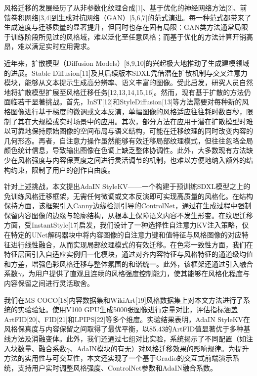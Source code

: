 \documentclass[twocolumn,a4paper,11pt]{ctexart}
\begin{document}
风格迁移的发展经历了从非参数化纹理合成[1]、基于优化的神经网络方法[2]、前馈卷积网络[3,4]到生成对抗网络（GAN）[5,6,7]的范式演进。每一种范式都带来了生成速度与迁移质量的显著提升，但同时也存在固有局限：GAN类方法通常局限于训练阶段所见过的风格域，难以泛化至任意风格；而基于优化的方法计算开销高昂，难以满足实时应用需求。

近年来，扩散模型（Diffusion Models）[8,9,10]的兴起极大地推动了生成建模领域的进展。Stable Diffusion[11]及其后续版本SDXL凭借潜在扩散机制与交叉注意力模块，能够从文本提示生成高分辨率、语义丰富的图像。受此启发，研究人员自然地将扩散模型扩展至风格迁移任务[12,13,14,15,16]。然而，现有基于扩散的方法仍面临若干显著挑战。首先，InST[12]和StyleDiffusion[13]等方法需要对每种新的风格图像进行基于梯度的微调或文本反演，单幅图像的风格适应往往耗时数百秒，限制了其在大规模或实时场景中的应用。其次，部分方法在应用于潜在扩散模型时难以可靠地保持原始图像的空间布局与语义结构，可能在迁移纹理的同时改变内容的几何形态。再者，自注意力操作虽然能够有效迁移局部纹理模式，但往往忽略全局颜色统计信息，导致输出图像在色调上缺乏整体协调性。此外，大多数现有方法缺少在风格强度与内容保真度之间进行灵活调节的机制，也难以方便地纳入额外的结构约束，限制了用户的创作自由度。

针对上述挑战，本文提出AdaIN StyleKV——一个构建于预训练SDXL模型之上的免训练风格迁移框架，无需任何微调或文本反演即可实现高质量的风格化。在结构保持方面，该框架引入Canny边缘检测引导的ControlNet，通过在生成过程中强制保留内容图像的边缘与轮廓结构，从根本上保障语义内容不发生形变。在纹理迁移方面，受InstantStyle[17]启发，我们设计了一种选择性自注意力KV注入策略，仅在特定的UNet解码器块中将内容图像的自注意力键和值特征与风格图像的对应特征进行线性融合，从而实现局部纹理模式的有效迁移。在色彩一致性方面，我们在特征层面引入自适应实例归一化模块，通过对齐内容特征与风格特征的通道级均值和方差，增强色彩风格迁移与整体氛围的和谐统一。此外，该框架还通过引入融合系数$\gamma$，为用户提供了直观且连续的风格强度控制能力，使其能够在风格化程度与内容保留之间进行灵活取舍。

我们在MS COCO[18]内容数据集和WikiArt[19]风格数据集上对本文方法进行了系统的实验验证。使用V100 GPU生成5000张图像进行定量对比，评估指标涵盖ArtFID[20]、FID[21]和LPIPS[22]等多个维度。实验结果表明，AdaIN StyleKV在风格保真度与内容保留之间取得了最优平衡，以85.43的ArtFID值显著优于多种基线方法及消融变体。此外，我们还通过七组对比实验，系统揭示了不同配置（如注入块数量、融合系数$\gamma$、AdaIN模块的有无）对风格迁移效果的影响规律。为提升方法的实用性与可交互性，本文还实现了一个基于Gradio的交互式前端演示系统，支持用户实时调整风格强度、ControlNet参数和AdaIN融合系数。
\end{document}
